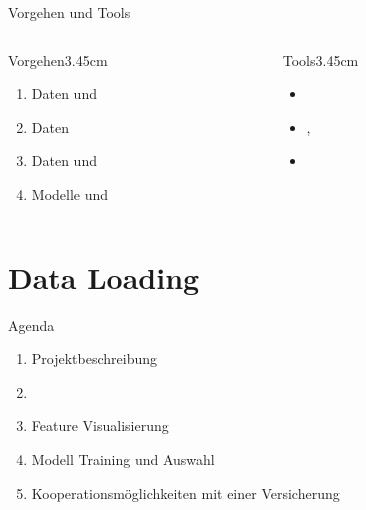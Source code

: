\begin{frame}{Vorgehen und Tools}
\begin{columns}
\begin{column}{0.5\textwidth}
\begin{MRuleBlock}{Vorgehen}{3.45cm}{\textwidth}
\begin{enumerate}
\item Daten  und 
\item Daten 
\item Daten  und 
\item Modelle  und 
\end{enumerate}
\end{MRuleBlock}
\end{column}
\begin{column}{0.5\textwidth }
\centering
\begin{MRuleBlock}{Tools}{3.45cm}{\textwidth}
\vspace{0.5\baselineskip}
\begin{itemize}
\item {}
\item {}, 
\item {}
\end{itemize}
\vspace{0.3\baselineskip}
\end{MRuleBlock}
\end{column}
\end{columns}
\end{frame}

\section{Data Loading}

\begin{frame}{Agenda}
\centering
\myBlock[0.6]{}
{
\begin{enumerate}
\item Projektbeschreibung
\item {}
\item Feature Visualisierung
\item Modell Training und Auswahl
\item Kooperationsmöglichkeiten mit einer Versicherung
\end{enumerate}
}
\end{frame}

